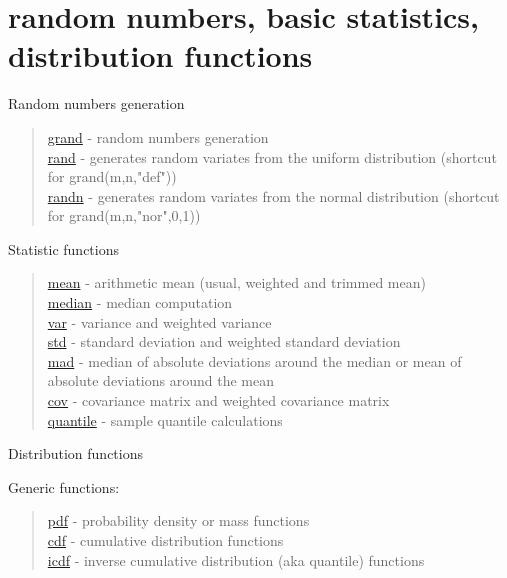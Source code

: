 \chapter*{random numbers, basic statistics, distribution functions}

Random numbers generation

\begin{quote}
\noindent
\hyperlink{grand}{grand} - random numbers generation\\
\hyperlink{rand}{rand} - generates random variates from the uniform distribution (shortcut for grand(m,n,"def"))\\
\hyperlink{randn}{randn} - generates random variates from the normal distribution (shortcut for grand(m,n,"nor",0,1))
\end{quote}

Statistic functions

\begin{quote}
\noindent
\hyperlink{mean}{mean} - arithmetic mean (usual, weighted and trimmed mean)\\
\hyperlink{median}{median} - median computation\\
\hyperlink{var}{var} - variance and weighted variance\\
\hyperlink{std}{std} - standard deviation and weighted standard deviation\\
\hyperlink{mad}{mad} - median of absolute deviations around the median or mean of absolute deviations around the mean\\
\hyperlink{cov}{cov} - covariance matrix and weighted covariance matrix\\
\hyperlink{quantile}{quantile} - sample quantile calculations\\
\end{quote}



Distribution functions

Generic functions: 
\begin{quote}
\noindent
\hyperlink{pdf}{pdf} - probability density or mass functions \\
\hyperlink{cdf}{cdf} - cumulative distribution functions \\
\hyperlink{icdf}{icdf} - inverse cumulative distribution (aka quantile) functions \\
\end{quote}

